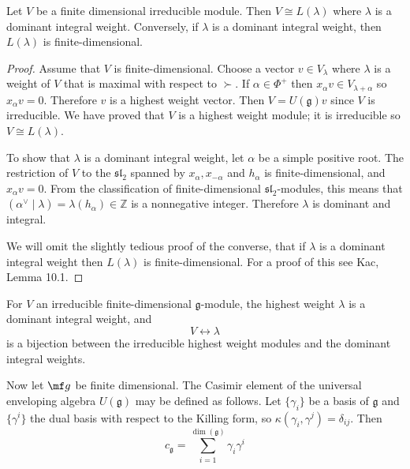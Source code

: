 \documentclass[12pt]{article}
\begin{document}
\begin{theorem}\label{thm:fd-classification}
    Let $V$ be a finite dimensional irreducible module. Then
    $V \cong L(\lambda)$ where $\lambda$ is a dominant integral weight.
    Conversely, if $\lambda$ is a dominant integral weight, then $L(\lambda)$
    is finite-dimensional.
\end{theorem}

\begin{proof}
    Assume that $V$ is finite-dimensional. Choose a vector
    $v \in V_\lambda$ where $\lambda$ is a weight of $V$ that is maximal with
    respect to $\succ$. If $\alpha \in \Phi^+$ then
    $x_\alpha v \in V_{\lambda + \alpha}$ so $x_\alpha v = 0$. Therefore $v$
    is a highest weight vector. Then $V = U(\mathfrak{g})v$ since $V$ is
    irreducible. We have proved that $V$ is a highest weight module; it is
    irreducible so $V \cong L(\lambda)$.

    To show that $\lambda$ is a dominant integral weight, let $\alpha$ be a
    simple positive root. The restriction of $V$ to the $\mathfrak{sl}_2$
    spanned by $x_\alpha, x_{-\alpha}$ and $h_\alpha$ is finite-dimensional,
    and $x_\alpha v = 0$. From the classification of finite-dimensional
    $\mathfrak{sl}_2$-modules, this means that
    $(\alpha^\vee \mid \lambda) = \lambda(h_\alpha) \in \mathbb{Z}$ is a
    nonnegative integer. Therefore $\lambda$ is dominant and integral.

    We will omit the slightly tedious proof of the converse, that if $\lambda$ is a dominant integral weight then $L(\lambda)$ is finite-dimensional. For a proof of this see Kac, Lemma 10.1.
\end{proof}

\begin{corollary}[Weyl]
    For $V$ an irreducible finite-dimensional $\mathfrak{g}$-module, the highest
    weight $\lambda$ is a dominant integral weight, and
    \[
        V \longleftrightarrow \lambda
    \]
    is a bijection between the irreducible highest weight modules and the
    dominant integral weights.
\end{corollary}

Now let $\mf g$ be finite dimensional. The Casimir element of the universal enveloping algebra $U(\mathfrak{g})$ may be defined as follows. Let $\{\gamma_i\}$ be a basis of $\mathfrak{g}$ and $\{\gamma^i\}$ the dual basis with respect
to the Killing form, so $\kappa(\gamma_i, \gamma^j) = \delta_{ij}$. Then
\[
    c_{\mathfrak{g}} = \sum_{i=1}^{\dim(\mathfrak{g})} \gamma_i \gamma^i
\]
\end{document}
